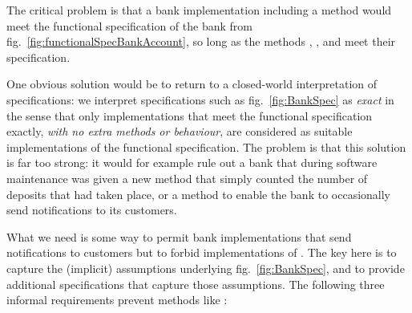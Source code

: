  
The critical problem is that a bank implementation including a 
method would meet the functional specification of the bank from
fig.~\ref{fig:functionalSpecBankAccount}, so long as the methods ,
, and     meet
their specification.

One obvious solution would be to return to a closed-world
interpretation of specifications: we interpret specifications such as
fig.~\ref{fig:BankSpec} as \emph{exact} in the sense that only
implementations that meet the functional specification exactly,
\emph{with no extra methods or behaviour}, are considered as suitable
implementations of the functional specification. The problem is that
this solution is far too strong: it would for example rule out a bank
that  during software maintenance was given a new method 
that simply counted the number of deposits that had taken place, or a method 
to enable the bank to occasionally send notifications  to its customers.
%
%


What we need is some way to permit bank implementations that 
send notifications to customers but to forbid implementations of . %
The key here is to capture the (implicit)
assumptions underlying fig.~\ref{fig:BankSpec}, and to provide
additional specifications that capture those assumptions.  The following
 three informal requirements   prevent methods like :

